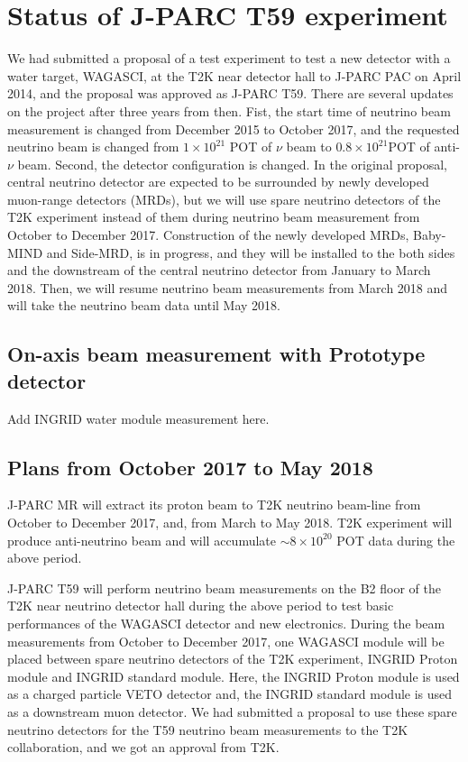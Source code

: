\section{Status of J-PARC T59 experiment}
We had submitted a proposal of a test experiment to test a new detector with a water target, WAGASCI, at the T2K near detector hall to J-PARC PAC on April 2014, and the proposal was approved as J-PARC T59.
 There are several updates on the project after three years from then.
 Fist, the start time of neutrino beam measurement is changed from December 2015 to October 2017, and the requested neutrino beam is changed from $1\times10^{21}$ POT of $\nu$ beam to $0.8\times10^{21} $POT of anti-$\nu$ beam. 
 Second, the detector configuration is changed. In the original proposal, central neutrino detector are expected to be surrounded by newly developed muon-range detectors (MRDs), but we will use spare neutrino detectors of the T2K experiment instead of them during neutrino beam measurement from October to December 2017. Construction of the newly developed MRDs, Baby-MIND and Side-MRD, is in progress, and they will be installed to the both sides and the downstream of the central neutrino detector from January to March 2018. Then, we will resume neutrino beam measurements from March 2018 and will take the neutrino beam data until May 2018.


\subsection{On-axis beam measurement with Prototype detector}
Add INGRID water module measurement here.


\subsection{Plans from October 2017 to May 2018}
J-PARC MR will extract its proton beam to T2K neutrino beam-line from October to December 2017, and, from March to May 2018. 
T2K experiment will produce anti-neutrino beam and will accumulate $\sim8\times10^{20}$ POT data during the above period.


 J-PARC T59 will perform neutrino beam measurements on the B2 floor of the T2K near neutrino detector hall during the above period to test basic performances of the WAGASCI detector and new electronics. During the beam measurements from October to December 2017, one WAGASCI module will be placed between spare neutrino detectors of the T2K experiment, INGRID Proton module and INGRID standard module. 
Here, the INGRID Proton module is used as a charged particle VETO detector and, the INGRID standard module is used as a downstream muon detector. 
We had submitted a proposal to use these spare neutrino detectors for the T59 neutrino beam measurements to the T2K collaboration, and we got an approval from T2K. 

